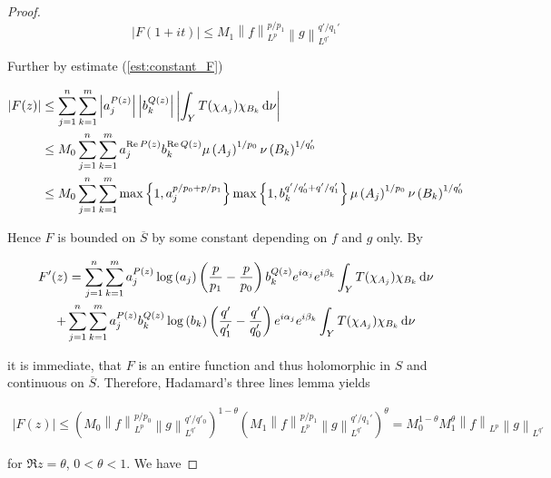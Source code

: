 \begin{proof}
\begin{equation*}
	\left| F(1 + it)\right| \leq M_1 \left\|f\right\|_{L^p}^{p/p_1}\left\|g\right\|_{L^{q'}}^{q'/q_1'}
\end{equation*}	

Further by estimate (\ref{est:constant_F}) 

\begin{equation*}
	\begin{aligned}
		\left| F(z)\right| &\leq \sum_{j = 1}^n\sum_{k = 1}^m \left| a_j^{P(z)}\right| \left| b_k^{Q(z)}\right| \left| \int_Y T(\chi_{A_j})\chi_{B_k} \mathop{}\!\mathrm{d}\nu\right|\\
		&\leq M_0\sum_{j = 1}^n\sum_{k = 1}^m a_j^{\operatorname{Re} P(z)}b_k^{\operatorname{Re} Q(z)}\mu\left(A_j\right)^{1/p_0}\nu\left(B_k\right)^{1/q_0'}\\
		&\leq M_0\sum_{j = 1}^n\sum_{k = 1}^m \max\left\{ 1, a_j^{p/p_0 + p/p_1}\right\} \max\left\{1,b_k^{q'/q_0' + q'/q_1'}\right\}\mu\left(A_j\right)^{1/p_0}\nu\left(B_k\right)^{1/q_0'}
	\end{aligned}
\end{equation*}


Hence $F$ is bounded on $\overline{S}$ by some constant depending on $f$ and $g$ only. By 

\begin{multline*}
	F'(z) = \sum_{j = 1}^n\sum_{k = 1}^m a^{P(z)}_j\log \left( a_j \right) \left( \frac{p}{p_1} - \frac{p}{p_0} \right) b_k^{Q(z)}e^{i\alpha_j} e^{i\beta_k} \int_YT(\chi_{A_j})\chi_{B_k}\mathop{}\!\mathrm{d}\nu \\
	+  \sum_{j = 1}^n\sum_{k = 1}^m a^{P(z)}_jb_k^{Q(z)}\log\left( b_k \right)\left( \frac{q'}{q'_1} - \frac{q'}{q'_0} \right)e^{i\alpha_j} e^{i\beta_k} \int_YT(\chi_{A_j})\chi_{B_k}\mathop{}\!\mathrm{d}\nu 
\end{multline*}

\noindent it is immediate, that $F$ is an entire function and thus holomorphic in $S$ and continuous on $\overline{S}$. Therefore, Hadamard's three lines lemma yields

\begin{gather*}
	\left| F(z) \right| \leq \left( M_0  \left\|f\right\|_{L^p}^{p/p_0} \left\|g\right\|_{L^{q'}}^{q'/q'_0} \right)^{1 - \theta}\left(  M_1 \left\|f\right\|_{L^p}^{p/p_1}\left\|g\right\|_{L^{q'}}^{q'/q_1'} \right)^\theta = M_0^{1 - \theta}M_1^\theta \left\|f\right\|_{L^p}\left\|g\right\|_{L^{q'}}
\end{gather*}

\noindent for $\Re z = \theta$, $0 < \theta < 1$. We have


\end{proof}
